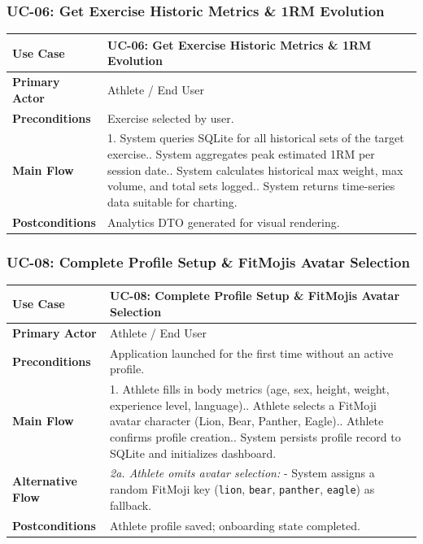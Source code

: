 \subsubsection{UC-06: Get Exercise Historic Metrics \& 1RM Evolution}
\begin{table}[h!]
\centering
\small
\begin{tabularx}{\textwidth}{l X}
\toprule
\textbf{Use Case} & \textbf{UC-06: Get Exercise Historic Metrics \& 1RM Evolution} \\
\midrule
\textbf{Primary Actor} & Athlete / End User \\
\textbf{Preconditions} & Exercise selected by user. \\
\textbf{Main Flow} & 
1. System queries SQLite for all historical sets of the target exercise.\newline
2. System aggregates peak estimated 1RM per session date.\newline
3. System calculates historical max weight, max volume, and total sets logged.\newline
4. System returns time-series data suitable for charting. \\
\textbf{Postconditions} & Analytics DTO generated for visual rendering. \\
\bottomrule
\end{tabularx}
\end{table}

\subsubsection{UC-08: Complete Profile Setup \& FitMojis Avatar Selection}
\begin{table}[h!]
\centering
\small
\begin{tabularx}{\textwidth}{l X}
\toprule
\textbf{Use Case} & \textbf{UC-08: Complete Profile Setup \& FitMojis Avatar Selection} \\
\midrule
\textbf{Primary Actor} & Athlete / End User \\
\textbf{Preconditions} & Application launched for the first time without an active profile. \\
\textbf{Main Flow} & 
1. Athlete fills in body metrics (age, sex, height, weight, experience level, language).\newline
2. Athlete selects a FitMoji avatar character (Lion, Bear, Panther, Eagle).\newline
3. Athlete confirms profile creation.\newline
4. System persists profile record to SQLite and initializes dashboard. \\
\textbf{Alternative Flow} & 
\textit{2a. Athlete omits avatar selection:}\newline
- System assigns a random FitMoji key (\texttt{lion}, \texttt{bear}, \texttt{panther}, \texttt{eagle}) as fallback. \\
\textbf{Postconditions} & Athlete profile saved; onboarding state completed. \\
\bottomrule
\end{tabularx}
\end{table}

